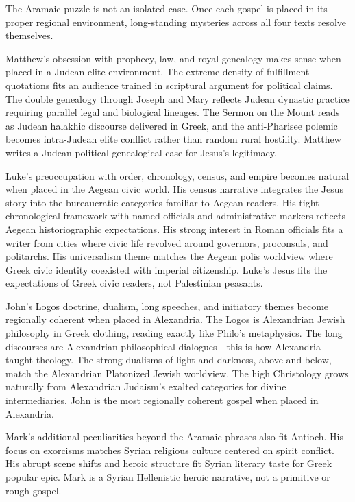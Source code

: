The Aramaic puzzle is not an isolated case.
Once each gospel is placed in its proper regional environment, long-standing mysteries across all four texts resolve themselves.

Matthew's obsession with prophecy, law, and royal genealogy makes sense when placed in a Judean elite environment.
The extreme density of fulfillment quotations fits an audience trained in scriptural argument for political claims.
The double genealogy through Joseph and Mary reflects Judean dynastic practice requiring parallel legal and biological lineages.
The Sermon on the Mount reads as Judean halakhic discourse delivered in Greek, and the anti-Pharisee polemic becomes intra-Judean elite conflict rather than random rural hostility.
Matthew writes a Judean political-genealogical case for Jesus's legitimacy.

Luke's preoccupation with order, chronology, census, and empire becomes natural when placed in the Aegean civic world.
His census narrative integrates the Jesus story into the bureaucratic categories familiar to Aegean readers.
His tight chronological framework with named officials and administrative markers reflects Aegean historiographic expectations.
His strong interest in Roman officials fits a writer from cities where civic life revolved around governors, proconsuls, and politarchs.
His universalism theme matches the Aegean polis worldview where Greek civic identity coexisted with imperial citizenship.
Luke's Jesus fits the expectations of Greek civic readers, not Palestinian peasants.

John's Logos doctrine, dualism, long speeches, and initiatory themes become regionally coherent when placed in Alexandria.
The Logos is Alexandrian Jewish philosophy in Greek clothing, reading exactly like Philo's metaphysics.
The long discourses are Alexandrian philosophical dialogues---this is how Alexandria taught theology.
The strong dualisms of light and darkness, above and below, match the Alexandrian Platonized Jewish worldview.
The high Christology grows naturally from Alexandrian Judaism's exalted categories for divine intermediaries.
John is the most regionally coherent gospel when placed in Alexandria.

Mark's additional peculiarities beyond the Aramaic phrases also fit Antioch.
His focus on exorcisms matches Syrian religious culture centered on spirit conflict.
His abrupt scene shifts and heroic structure fit Syrian literary taste for Greek popular epic.
Mark is a Syrian Hellenistic heroic narrative, not a primitive or rough gospel.


